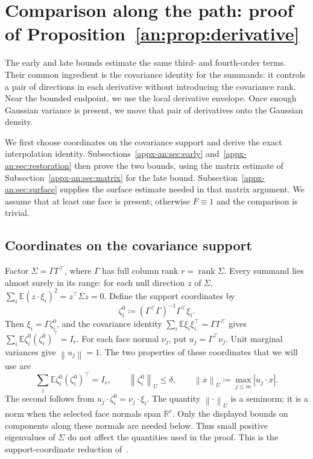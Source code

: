 \documentclass[11pt,letterpaper]{article}
\theoremstyle{remark}
\newcommand{\E}{\mathbb E}
\newcommand{\R}{\mathbb R}
\newcommand{\norm}[1]{\left\lVert#1\right\rVert}
\begin{document}
\section{Comparison along the path: proof of Proposition~\ref{an:prop:derivative}}
\label{appx-sec:support}

The early and late bounds estimate the same third- and fourth-order
terms. Their common ingredient is the covariance identity for the
summands: it controls a pair of directions in each derivative without
introducing the covariance rank. Near the bounded endpoint, we use
the local derivative envelope. Once enough Gaussian variance is
present, we move that pair of derivatives onto the Gaussian density.

We first choose coordinates on the covariance support and derive the
exact interpolation identity. Subsections~\ref{appx-an:sec:early}
and~\ref{appx-an:sec:restoration} then prove the two bounds, using
the matrix estimate of Subsection~\ref{appx-an:sec:matrix} for the
late bound. Subsection~\ref{appx-an:sec:surface} supplies the surface
estimate needed in that matrix argument. We assume that at least one
face is present; otherwise \(F\equiv1\) and the comparison is trivial.

\subsection{Coordinates on the covariance support}
\label{appx-an:sec:coords}

Factor \(\Sigma=\Gamma\Gamma^\top\), where \(\Gamma\) has full column
rank \(r=\operatorname{rank}\Sigma\). Every summand lies almost surely
in its range: for each null direction \(z\) of \(\Sigma\),
\(\sum_i\E(z\cdot\xi_i)^2=z^\top\Sigma z=0\).
Define the support coordinates by
\[
 \zeta_i^0\coloneqq(\Gamma^\top\Gamma)^{-1}\Gamma^\top\xi_i.
\]
Then \(\xi_i=\Gamma\zeta_i^0\), and the covariance identity
\(\sum_i\E\xi_i\xi_i^\top=\Gamma\Gamma^\top\) gives
\(\sum_i\E\zeta_i^0(\zeta_i^0)^\top=I_r\).
For each face normal \(\nu_j\), put \(u_j=\Gamma^\top\nu_j\).
Unit marginal variances give \(\norm{u_j}=1\). The two properties
of these coordinates that we will use are
\begin{equation}
 \sum_i\E\zeta_i^0(\zeta_i^0)^\top=I_r,
 \qquad \norm{\zeta_i^0}_U\le\delta,
 \qquad \norm x_U\coloneqq \max_{j\le m}|u_j\cdot x|.
 \label{appx-eq:projected-bound}
\end{equation}
The second follows from \(u_j\cdot\zeta_i^0=\nu_j\cdot\xi_i\).
The quantity \(\norm{\cdot}_U\) is a seminorm; it is a norm when
the selected face normals span \(\R^r\). Only the displayed bounds
on components along these normals are needed below.
Thus small positive eigenvalues of \(\Sigma\) do not affect the
quantities used in the proof. This is the support-coordinate reduction
of~\cite[Section~2.3]{GaoZhang}.
\end{document}
